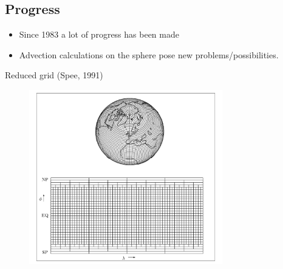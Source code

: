 \documentclass[hyperref={pdfstartview=Fit}]{beamer}
\newcommand{\imsize}{}
\begin{document}
\subsection{Progress}
\begin{frame}
\begin{itemize}
\item Since 1983 a lot of progress has been made
\item Advection calculations on the sphere pose new problems/possibilities. 
\end{itemize}
\end{frame}

\begin{frame}
Reduced grid (Spee, 1991)
\begin{figure}
\renewcommand{\imsize}{0.75\textwidth}
\includegraphics[width=\imsize]{globe}%
\end{figure}
\end{frame}
\end{document}
